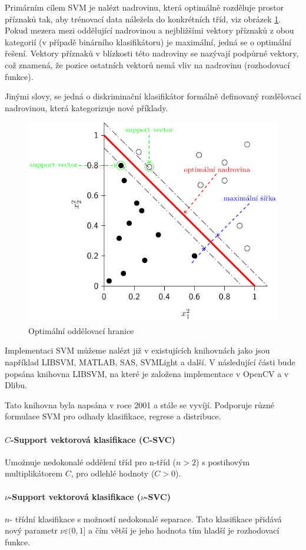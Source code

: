 Primárním cílem SVM je nalézt nadrovinu, která optimálně rozděluje prostor příznaků tak, aby trénovací data náležela do konkrétních tříd, viz obrázek \ref{fig:svm}. Pokud mezera mezi oddělující nadrovinou a nejbližšími vektory příznaků z obou kategorií (v případě binárního klasifikátoru) je maximální, jedná se o optimální řešení. Vektory příznaků v blízkosti této nadroviny se nazývají podpůrné vektory, což znamená, že pozice ostatních vektorů nemá vliv na nadrovinu (rozhodovací funkce). 

Jinými slovy, se jedná o diskriminační klasifikátor formálně definovaný rozdělovací nadrovinou, která kategorizuje nové příklady.
\begin{figure}[H]
\centering
\includegraphics[width=.7\linewidth]{figures/svm.pdf}
\caption{Optimální oddělovací hranice}
\label{fig:svm}
\end{figure}

Implementaci SVM můžeme nalézt již v existujících knihovnách jako jsou například LIBSVM, MATLAB, SAS, SVMLight a další. V následující části bude popsána knihovna LIBSVM, na které je založena implementace v OpenCV a v Dlibu.  

Tato knihovna byla napsána v roce 2001 \cite{libsvm} a stále se vyvíjí. Podporuje různé formulace SVM pro odhady klasifikace, regrese a distribuce.

\paragraph*{$C$-Support vektorová klasifikace (C-SVC)}
Umožnuje nedokonalé oddělení tříd pro n-tříd ($n > 2$) s postihovým multiplikátorem $C$, pro odlehlé hodnoty ($C > 0$). \cite{csvmclass}

\paragraph*{$\nu$-Support vektorová klasifikace ($\nu$-SVC)}
$n$- třídní klasifikace s možností nedokonalé separace. Tato klasifikace přidává nový parametr $\nu \varepsilon (0,1]$ a čím větší je jeho hodnota tím hladší je rozhodovací funkce. \cite{nusvmsvrclass}

